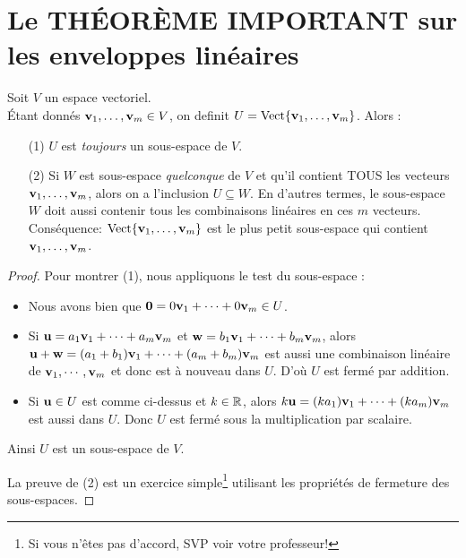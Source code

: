 
\section{Le THÉORÈME IMPORTANT sur les enveloppes linéaires}

\begin{theorem}\label{span}
Soit $V$ un espace vectoriel. \hfill \\ Étant donnés $\mathbf{v}_1, \ldots, \mathbf{v}_m \in V$, on definit $U = \operatorname{ Vect} \normalsize\{ \mathbf{v}_1, \ldots, \mathbf{v}_m\normalsize\} $.
Alors : 
\begin{enumerate}
\item[(1)] $U  $ est \emph{toujours} un sous-espace de $V$.
\item[(2)] Si $W$ est sous-espace \emph{quelconque} de $V$ et qu'il contient TOUS les vecteurs $\mathbf{v}_1, \ldots, \mathbf{v}_m$, alors on a l'inclusion $U \subseteq W$. En d'autres termes, le sous-espace
$W$ doit aussi contenir tous les combinaisons linéaires en ces $m$ vecteurs.  Conséquence: $\operatorname{ Vect} \normalsize\{ \mathbf{v}_1, \ldots, \mathbf{v}_m\normalsize\}$ est
le plus petit sous-espace qui contient $\mathbf{v}_1, \ldots, \mathbf{v}_m$.
\end{enumerate}
\end{theorem}

\begin{proof}
Pour montrer (1), nous appliquons le test du sous-espace :
\begin{itemize}
\item Nous avons bien que $\mathbf{0} = 0 \mathbf{v}_1 + \cdots + 0\mathbf{v}_m \in U$.
\item Si $\mathbf{u} = a_1\mathbf{v}_1 + \cdots + a_m\mathbf{v}_m$ et $\mathbf{w} = b_1\mathbf{v}_1 + \cdots + b_m\mathbf{v}_m$, alors $\mathbf{u} + \mathbf{w} = (a_1+b_1)\mathbf{v}_1 + \cdots + (a_m+b_m)\mathbf{v}_m$ est aussi une combinaison linéaire de $\mathbf{v}_1, \cdots, \mathbf{v}_m$ et donc est à nouveau dans $U$.
D'o\`u $U$ est fermé par addition.
\item Si $\mathbf{u} \in U$ est comme ci-dessus et $k \in \mathbb{R}$, alors
$k\mathbf{u} = (ka_1)\mathbf{v}_1 + \cdots + (ka_m)\mathbf{v}_m$  est aussi dans $U$.  Donc
$U$ est fermé sous la multiplication par scalaire.
\end{itemize}
Ainsi $U$ est un sous-espace de $V$.

La preuve de (2) est un exercice simple\footnote{Si vous n'\^etes pas d'accord, SVP voir votre professeur!} utilisant les propriétés de fermeture des sous-espaces.
\end{proof}

